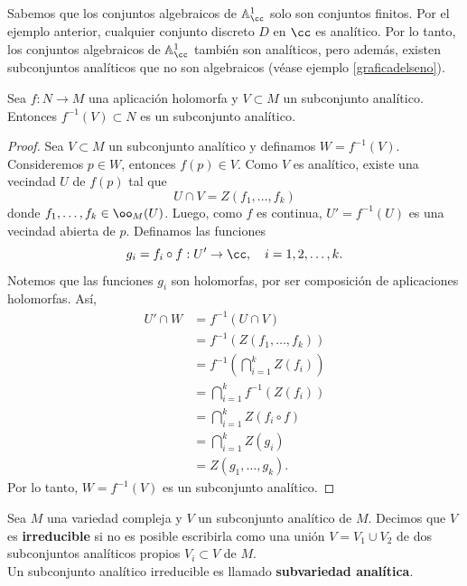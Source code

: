     \begin{remark}
    	Sabemos que los conjuntos algebraicos de $\mathbb{A}^1_\cc$ solo son conjuntos finitos. Por el ejemplo anterior, cualquier conjunto discreto $D$ en $\cc$ es analítico. Por lo tanto, los conjuntos algebraicos de  $\mathbb{A}^1_\cc$ también son analíticos, pero además, existen subconjuntos analíticos que no son algebraicos (véase ejemplo \ref{graficadelseno}).
    \end{remark}
    
    \begin{lemma}\label{preimagen analitico}
    	Sea $f:N\to M$ una aplicación holomorfa y $V\subset M$ un subconjunto analítico. Entonces $f^{-1}(V)\subset N$ es un subconjunto analítico.
    \end{lemma}
    \begin{proof}
    	Sea $V\subset M$ un subconjunto analítico y definamos $W=f^{-1}(V)$. Consideremos $p\in W$, entonces $f(p)\in V$. Como $V$ es analítico, existe una vecindad $U$ de $f(p)$ tal que
    	\begin{equation*}
    		U\cap V=Z(f_1,\dots,f_k)
    	\end{equation*} 
    	donde $f_1,\dots,f_k\in\oo_M(U)$. Luego, como $f$ es continua, $U'=f^{-1}(U)$ es una vecindad abierta de $p$. Definamos las funciones
    	\begin{equation*}
    		g_i=f_i\circ f:U'\to\cc,\quad i=1,2,\dots,k.
    	\end{equation*}
    	Notemos que las funciones $g_i$ son holomorfas, por ser composición de aplicaciones holomorfas. Así, 
    	\begin{align*}
    		U'\cap W&=f^{-1}(U\cap V)\\
    		&=f^{-1}(Z(f_1,\dots,f_k))\\
    		&=f^{-1}\left(\bigcap_{i=1}^k Z(f_i) \right)\\
    		&= \bigcap_{i=1}^k f^{-1}(Z(f_i))\\
    		&=\bigcap_{i=1}^k Z(f_i\circ f)\\
    		&=\bigcap_{i=1}^k Z(g_i)\\
    		&=Z(g_1,\dots,g_k).
    	\end{align*}
    	Por lo tanto, $W=f^{-1}(V)$ es un subconjunto analítico.
    \end{proof}
    
    \begin{definition}
    	Sea $M$ una variedad compleja y $V$ un subconjunto analítico de $M$. Decimos que $V$ es \textbf{irreducible} si no es posible escribirla como una unión $V=V_1\cup V_2$ de dos subconjuntos analíticos propios $V_i\subset V$ de $M$.\\
    	Un subconjunto analítico irreducible es llamado \textbf{subvariedad analítica}.
    \end{definition}
    
